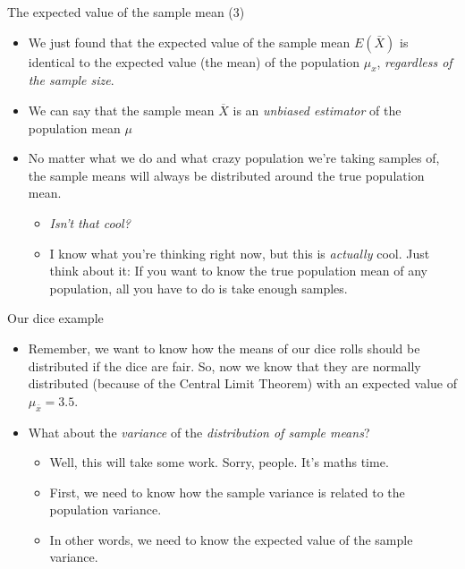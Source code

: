 \begin{frame}{The expected value of the sample mean (3)}

\begin{itemize}
\itemsep1pt\parskip0pt
\item
  We just found that the expected value of the sample mean
  \(E(\bar{X})\) is identical to the expected value (the mean) of the
  population \(\mu_x\), \emph{regardless of the sample size}.
\item
  We can say that the sample mean \(\overline{X}\) is an \emph{unbiased
  estimator} of the population mean \(\mu\)
\item
  No matter what we do and what crazy population we're taking samples
  of, the sample means will always be distributed around the true
  population mean.

  \begin{itemize}
  \itemsep1pt\parskip0pt
  \item
    \emph{Isn't that cool?}
  \item
    I know what you're thinking right now, but this is \emph{actually}
    cool. Just think about it: If you want to know the true population
    mean of any population, all you have to do is take enough samples.
  \end{itemize}
\end{itemize}

\end{frame}

\begin{frame}{Our dice example}

\begin{itemize}
\itemsep1pt\parskip0pt
\item
  Remember, we want to know how the means of our dice rolls should be
  distributed if the dice are fair. So, now we know that they are
  normally distributed (because of the Central Limit Theorem) with an
  expected value of \(\mu_{\bar{x}} = 3.5\).
\item
  What about the \emph{variance} of the \emph{distribution of sample
  means}?

  \begin{itemize}
  \itemsep1pt\parskip0pt
  \item
    Well, this will take some work. Sorry, people. It's maths time.
  \item
    First, we need to know how the sample variance is related to the
    population variance.
  \item
    In other words, we need to know the expected value of the sample
    variance.
  \end{itemize}
\end{itemize}

\end{frame}

